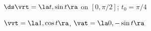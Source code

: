 {$\ds \vrt = \la t,\sin t \ra$ on $[0,\pi/2]$; $t_0= \pi/4$
}
{
$\vvt = \la 1,\cos t\ra$, $\vat = \la 0,-\sin t\ra$

}

